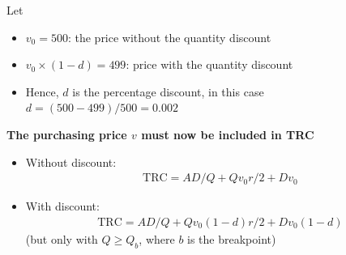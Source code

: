 \documentclass[10pt]{article}
\begin{document}
Let 
\begin{itemize}
    \item $v_0 = 500 $: the price without the quantity discount 
    \item $v_0\times (1 - d) = 499 $: price with the quantity discount 
    \item Hence, $d $ is the percentage discount, in this case $d = (500 - 499) / 500 = 0.002 $
\end{itemize}
\textbf{The purchasing price $v $ must now be included in TRC}
\begin{itemize}
    \item Without discount:
    \begin{gather*}
        \text{TRC} = AD/Q + Qv_0r / 2 + Dv_0
    \end{gather*}
    \item With discount:
    \begin{gather*}
        \text{TRC} = AD / Q + Qv_0(1 - d)r / 2 + Dv_0(1 -d)
    \end{gather*}
    (but only with $Q \ge Q_b $, where $b $ is the breakpoint)
\end{itemize}
\newpage 
\end{document}
